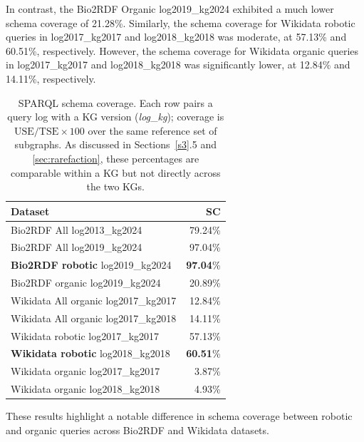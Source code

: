 \documentclass[sw]{iosart2x}
\begin{document}
In contrast, the Bio2RDF Organic log2019\_kg2024 exhibited a much lower schema coverage of 21.28\%. Similarly, the schema coverage for Wikidata robotic queries in log2017\_kg2017 and log2018\_kg2018 was moderate, at 57.13\% and 60.51\%, respectively. However, the schema coverage for Wikidata organic queries in log2017\_kg2017 and log2018\_kg2018 was significantly lower, at 12.84\% and 14.11\%, respectively.

\begin{table}[ht]
\centering
\caption{SPARQL schema coverage. Each row pairs a query log with a KG version (\emph{log}\_\emph{kg}); coverage is $\mathrm{USE}/\mathrm{TSE}\times100$ over the same reference set of subgraphs. As discussed in Sections~\ref{s3}.5 and \ref{sec:rarefaction}, these percentages are comparable within a KG but not directly across the two KGs.}
\label{tab:5}
\begin{tabular}{l|r}
\hline
Dataset & SC \\
\hline
Bio2RDF All log2013\_kg2024 & 79.24\% \\
Bio2RDF All log2019\_kg2024 & 97.04\% \\
\textbf{Bio2RDF robotic }log2019\_kg2024 & \textbf{97.04}\%\\
Bio2RDF organic log2019\_kg2024 & 20.89\% \\
Wikidata All organic log2017\_kg2017 & 12.84\% \\
Wikidata All organic log2017\_kg2018 & 14.11\% \\
Wikidata robotic log2017\_kg2017 & 57.13\% \\
\textbf{Wikidata robotic} log2018\_kg2018 & \textbf{60.51}\% \\
Wikidata organic log2017\_kg2017 & 3.87\%  \\
Wikidata organic log2018\_kg2018 & 4.93\%  \\
\hline
\end{tabular}
\end{table}


These results highlight a notable difference in schema coverage between robotic and organic queries across Bio2RDF and Wikidata datasets.
\end{document}
